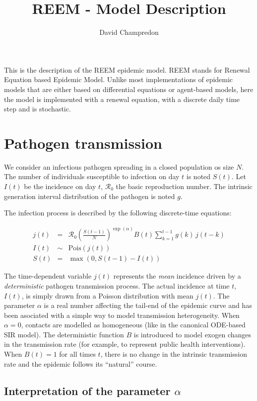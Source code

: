 \documentclass[11pt]{article} %
\title{\textsf{REEM - Model Description}}
\author{David Champredon}
\newcommand{\Ro}{\ensuremath{\mathcal{R}_0}\xspace}
\begin{document}
\maketitle


This is the description of the REEM epidemic model. REEM stands for Renewal Equation based Epidemic Model. Unlike most implementations of epidemic models that are either based on differential equations or agent-based models, here the model is implemented with a renewal equation, with a discrete daily time step and is stochastic.

\section{Pathogen transmission}

We consider an infectious pathogen spreading in a closed population os size $N$. The number of individuals susceptible to infection on day $t$ is noted $S(t)$. 
Let $I(t)$ be the incidence on day $t$, \Ro the basic reproduction number.
The intrinsic generation interval distribution of the pathogen is noted $g$. 

The infection process is described by the following discrete-time equations:

\begin{eqnarray}
\label{eq:reinc}
j(t) & = & \Ro \left(\frac{S(t-1)}{N}\right)^{\exp(\alpha)} B(t) \sum_{k=1}^{t-1} g(k)\, j(t-k) \\ 
I(t) & \sim & \mathrm{Pois}(j(t))   \\
S(t) & = & \max(0, S(t-1) - I(t))
\end{eqnarray}

The time-dependent variable $j(t)$ represents the \emph{mean} incidence driven by a \emph{deterministic} pathogen transmission process.
The actual incidence at time $t$, $I(t)$, is simply drawn from a Poisson distribution with mean $j(t)$.
The parameter $\alpha$ is a real number affecting the tail-end of the epidemic curve and has been asociated with a simple way to model transmission heterogeneity. When $\alpha=0$, contacts are modelled as homogeneous (like in the canonical ODE-based SIR model). 
The deterministic function $B$ is introduced to model exogen changes in the transmission rate (for example, to represent public health interventions). When $B(t) = 1$ for all times $t$, there is no change in the intrinsic transmission rate and the epidemic follows its ``natural'' course. 

\subsection{Interpretation of the parameter $\alpha$}
\end{document}
